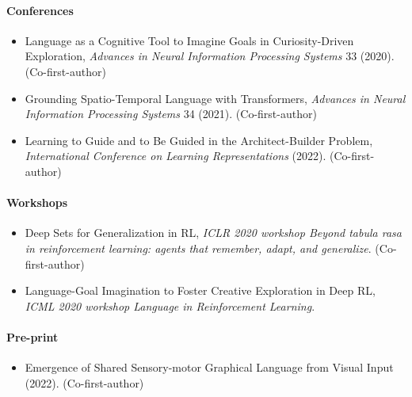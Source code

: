 \paragraph{Conferences}

\begin{itemize}
	\item Language as a Cognitive Tool to Imagine Goals in Curiosity-Driven Exploration, \textit{Advances in Neural Information Processing Systems} 33 (2020). \cite{colas2020language} (Co-first-author)
	\item Grounding Spatio-Temporal Language with Transformers, \textit{Advances in Neural Information Processing Systems} 34 (2021). \cite{karch2021grounding} (Co-first-author)
	\item Learning to Guide and to Be Guided in the Architect-Builder Problem, \textit{International Conference on Learning Representations} (2022). \cite{barde2022learning} (Co-first-author)
\end{itemize}

\paragraph{Workshops}

\begin{itemize}
	\item Deep Sets for Generalization in RL, \textit{ICLR 2020 workshop Beyond tabula rasa in reinforcement learning: agents that remember, adapt, and generalize}. \cite{karch2020deepset} (Co-first-author)
	\item Language-Goal Imagination to Foster Creative Exploration in Deep RL, \textit{ICML 2020 workshop Language in Reinforcement Learning}. 
\end{itemize}

\paragraph{Pre-print}

\begin{itemize}
	\item Emergence of Shared Sensory-motor Graphical Language from Visual Input (2022). \cite{lemesle2022emergence} (Co-first-author)
\end{itemize}


